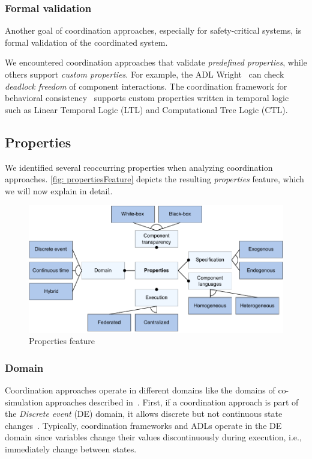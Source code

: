 \documentclass[runningheads]{llncs}
\begin{document}
\subsubsection{Formal validation} Another goal of coordination approaches, especially for safety-critical systems, is formal validation of the coordinated system.

We encountered coordination approaches that validate \textit{predefined properties}, while others support \textit{custom properties}.
For example, the ADL Wright~\cite{allenFormalBasisArchitectural1997} can check \textit{deadlock freedom} of component interactions.
The coordination framework for behavioral consistency~\cite{krauterBehavioralConsistencyMultimodeling2023} supports custom properties written in temporal logic such as Linear Temporal Logic (LTL) and Computational Tree Logic (CTL).

\subsection{Properties}
We identified several reoccurring properties when analyzing coordination approaches.
\autoref{fig: propertiesFeature} depicts the resulting \textit{properties} feature, which we will now explain in detail.

\begin{figure}[ht]
	\centering
	\includegraphics[width=1\textwidth]{images/properties_feature}
	\caption{Properties feature}
	\label{fig: propertiesFeature}
\end{figure}

\subsubsection{Domain} Coordination approaches operate in different domains like the domains of co-simulation approaches described in~\cite{gomesCoSimulationSurvey2019}.
First, if a coordination approach is part of the \textit{Discrete event} (DE) domain, it allows discrete but not continuous state changes~\cite{gomesCoSimulationSurvey2019}.
Typically, coordination frameworks and ADLs operate in the DE domain since variables change their values discontinuously during execution, i.e., immediately change between states.
\end{document}
